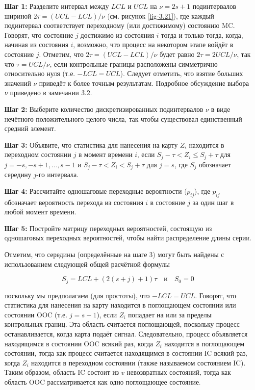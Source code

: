 \noindent\textbf{Шаг 1:} Разделите интервал между \(LCL\) и \(UCL\) на \(\nu = 2s + 1\) подинтервалов шириной \(2\tau = (UCL - LCL)/\nu\) (см. рисунок \ref{fig-3.21}), где каждый подинтервал соответствует переходному (или достижимому) состоянию MC. Говорят, что состояние \(j\) достижимо из состояния \(i\) тогда и только тогда, когда, начиная из состояния \(i\), возможно, что процесс на некотором этапе войдёт в состояние \(j\). Отметим, что \(2\tau = (UCL - LCL)/\nu\) будет равно \(2\tau = 2UCL/\nu\), так что \(\tau = UCL/\nu\), если контрольные границы расположены симметрично относительно нуля (т.е. \(-LCL = UCL\)). Следует отметить, что взятие больших значений \(\nu\) приведёт к более точным результатам. Подробное обсуждение выбора \(\nu\) приведено в замечании 3.2.

\noindent\textbf{Шаг 2:} Выберите количество дискретизированных подинтервалов \(\nu\) в виде нечётного положительного целого числа, так чтобы существовал единственный средний элемент.

\noindent\textbf{Шаг 3:} Объявите, что статистика для нанесения на карту \(Z_{i}\) находится в переходном состоянии \(j\) в момент времени \(i\), если \(S_{j} - \tau < Z_{i} \leq S_{j} + \tau\) для \(j = -s, -s+1, \ldots, s-1\) и \(S_{j} - \tau < Z_{i} < S_{j} + \tau\) для \(j = s\), где \(S_{j}\) обозначает середину \(j\)-го интервала.

\noindent\textbf{Шаг 4:} Рассчитайте одношаговые переходные вероятности (\(p_{ij}\)), где \(p_{ij}\) обозначает вероятность перехода из состояния \(i\) в состояние \(j\) за один шаг в любой момент времени.

\noindent\textbf{Шаг 5:} Постройте матрицу переходных вероятностей, состоящую из одношаговых переходных вероятностей, чтобы найти распределение длины серии.

Отметим, что середины (определённые на шаге 3) могут быть найдены с использованием следующей общей расчётной формулы

\[
S_{j} = LCL + (2(s + j) + 1)\tau \quad \text{и} \quad S_{0} = 0
\]

поскольку мы предполагаем (для простоты), что \(-LCL = UCL\). Говорят, что статистика для нанесения на карту находится в поглощающем состоянии или состоянии OOC (т.е. \(j = s + 1\)), если \(Z_{i}\) попадает на или за пределы контрольных границ. Эта область считается поглощающей, поскольку процесс останавливается, когда карта подаёт сигнал. Следовательно, процесс объявляется находящимся в состоянии OOC всякий раз, когда \(Z_{i}\) находится в поглощающем состоянии, тогда как процесс считается находящимся в состоянии IC всякий раз, когда \(Z_{i}\) находится в переходном состоянии (также называемом состоянием IC). Таким образом, область IC состоит из \(v\) невозвратных состояний, тогда как область OOC рассматривается как одно поглощающее состояние.

